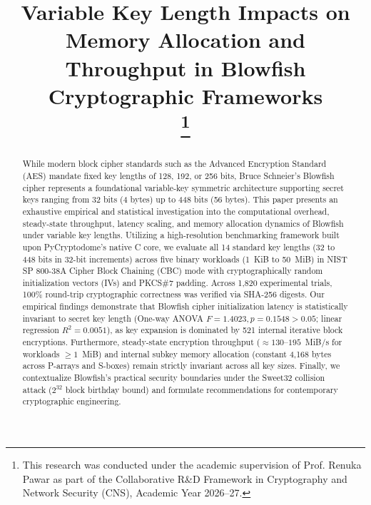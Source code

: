 \documentclass[conference]{IEEEtran}
\begin{document}
\title{Variable Key Length Impacts on Memory Allocation and Throughput in Blowfish Cryptographic Frameworks\\
\thanks{This research was conducted under the academic supervision of Prof. Renuka Pawar as part of the Collaborative R\&D Framework in Cryptography and Network Security (CNS), Academic Year 2026--27.}
}

\author{
\and
{}
}

\maketitle

\begin{abstract}
While modern block cipher standards such as the Advanced Encryption Standard (AES) mandate fixed key lengths of 128, 192, or 256 bits, Bruce Schneier's Blowfish cipher represents a foundational variable-key symmetric architecture supporting secret keys ranging from 32 bits (4 bytes) up to 448 bits (56 bytes). This paper presents an exhaustive empirical and statistical investigation into the computational overhead, steady-state throughput, latency scaling, and memory allocation dynamics of Blowfish under variable key lengths. Utilizing a high-resolution benchmarking framework built upon PyCryptodome's native C core, we evaluate all 14 standard key lengths (32 to 448 bits in 32-bit increments) across five binary workloads (1~KiB to 50~MiB) in NIST SP 800-38A Cipher Block Chaining (CBC) mode with cryptographically random initialization vectors (IVs) and PKCS\#7 padding. Across 1,820 experimental trials, 100\% round-trip cryptographic correctness was verified via SHA-256 digests. Our empirical findings demonstrate that Blowfish cipher initialization latency is statistically invariant to secret key length (One-way ANOVA $F = 1.4023, p = 0.1548 > 0.05$; linear regression $R^2 = 0.0051$), as key expansion is dominated by 521 internal iterative block encryptions. Furthermore, steady-state encryption throughput ($\approx 130$--$195$~MiB/s for workloads $\ge 1$~MiB) and internal subkey memory allocation (constant 4,168 bytes across P-arrays and S-boxes) remain strictly invariant across all key sizes. Finally, we contextualize Blowfish's practical security boundaries under the Sweet32 collision attack ($2^{32}$ block birthday bound) and formulate recommendations for contemporary cryptographic engineering.
\end{abstract}
\end{document}
